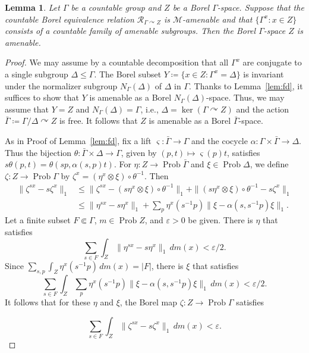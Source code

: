 \documentclass[12pt,nosumlimits,nonamelimits]{amsart}
\newtheorem{lem}[thm]{Lemma}
\theoremstyle{remark}
\theoremstyle{definition}
\newcommand{\cM}{\mathcal{M}}
\newcommand{\cR}{\mathcal{R}}
\newcommand{\ve}{\varepsilon}
\newcommand{\Ga}{\Gamma}
\newcommand{\acts}{\curvearrowright}
\DeclareMathOperator{\Prob}{Prob}
\begin{document}
\begin{lem}\label{lem:borelamencriterion}
Let $\Ga$ be a countable group and 
$Z$ be a Borel $\Ga$-space. 
Suppose that the countable Borel equivalence 
relation $\cR_{\Ga\acts Z}$ is $\cM$-amenable 
and that $\{\Ga^x : x\in Z\}$ consists of 
a countable family of amenable subgroups. 
Then the Borel $\Ga$-space $Z$ is amenable.
\end{lem}
\begin{proof}
We may assume by a countable decomposition 
that all $\Ga^x$ are conjugate to a single subgroup $\Delta\le\Ga$. 
The Borel subset $Y \coloneq \{ x\in Z : \Ga^x =\Delta \}$ 
is invariant under the normalizer subgroup $N_\Ga(\Delta)$ 
of $\Delta$ in $\Ga$.
Thanks to Lemma~\ref{lem:fd}, 
it suffices to show that $Y$ is amenable as 
a Borel $N_\Ga(\Delta)$-space.
Thus, we may assume that $Y=Z$ and $N_\Ga(\Delta)=\Ga$, 
i.e., $\Delta = \ker(\Ga\acts Z)$ 
and the action $\bar{\Ga} \coloneq \Ga/\Delta\acts Z$ is free. 
It follows that $Z$ is amenable as a Borel $\bar{\Ga}$-space. 

As in Proof of Lemma~\ref{lem:fd},  
fix a lift $\varsigma\colon \bar{\Ga}\to\Ga$ and the cocycle
$\alpha\colon \Ga \times \bar{\Ga} \to \Delta$.
Thus the bijection
$\theta\colon \bar{\Ga} \times \Delta \to\Ga$, given by 
 $(p,t) \mapsto \varsigma(p)t$, 
satisfies $s\theta(p,t) = \theta( sp,\alpha(s,p)t )$. 
For $\eta\colon Z\to \Prob \bar{\Ga}$ 
and $\xi\in\Prob \Delta$, we define 
$\zeta\colon Z\to\Prob \Ga$ by 
$\zeta^x = (\eta^x\otimes \xi)\circ\theta^{-1}$. 
Then 
\begin{align*}
\| \zeta^{sx}-s\zeta^x\|_1
 &\le \| \zeta^{sx}-(s\eta^x\otimes\xi)\circ\theta^{-1}\|_1
   + \| (s\eta^x\otimes\xi)\circ\theta^{-1}- s\zeta^x\|_1\\
 &\le \| \eta^{sx}-s\eta^x\|_1 
   + \sum_p\eta^x(s^{-1}p)\|\xi-\alpha(s,s^{-1}p)\xi\|_1.
\end{align*}
Let a finite subset $F\Subset\Ga$, $m\in\Prob Z$, and $\ve>0$ be given. 
There is $\eta$ that satisfies 
\[
\sum_{s\in F}\int_Z \| \eta^{sx}-s\eta^x\|_1\,dm(x) < \ve/2.
\]
Since $\sum_{s,p}\int_Z \eta^x(s^{-1}p)\,dm(x) = |F|$, 
there is $\xi$ that satisfies 
\[
\sum_{s\in F}\int_Z \sum_p\eta^x(s^{-1}p)\|\xi-\alpha(s,s^{-1}p)\xi\|_1\,dm(x) <\ve/2.
\]
It follows that for these $\eta$ and $\xi$, 
the Borel map $\zeta\colon Z\to\Prob \Ga$ satisfies\\ 
\begin{minipage}{.9\textwidth}
\[
\sum_{s\in F}\int_Z \| \zeta^{sx}-s\zeta^x\|_1\,dm(x) < \ve.
\]
\end{minipage} 
\end{proof}
\end{document}
